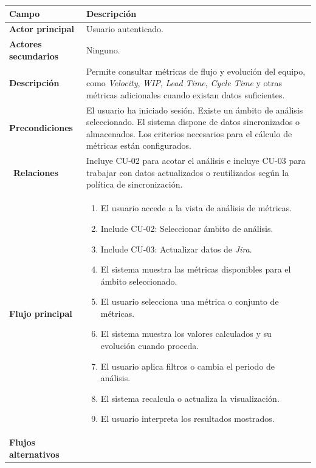 {\renewcommand{\arraystretch}{1.25}\footnotesize
\begin{longtable}{p{3.2cm}p{10.2cm}}
\toprule
\textbf{Campo} & \textbf{Descripción} \\
\midrule
\textbf{Actor principal} & Usuario autenticado. \\
\textbf{Actores secundarios} & Ninguno. \\
\textbf{Descripción} & Permite consultar métricas de flujo y evolución del equipo, como \textit{Velocity}, \textit{WIP}, \textit{Lead Time}, \textit{Cycle Time} y otras métricas adicionales cuando existan datos suficientes. \\
\textbf{Precondiciones} & El usuario ha iniciado sesión. Existe un ámbito de análisis seleccionado. El sistema dispone de datos sincronizados o almacenados. Los criterios necesarios para el cálculo de métricas están configurados. \\\
\textbf{Relaciones} & Incluye CU-02 para acotar el análisis e incluye CU-03 para trabajar con datos actualizados o reutilizados según la política de sincronización. \\
\textbf{Flujo principal} & \begin{minipage}[t]{10.2cm}\begin{enumerate}[noitemsep,leftmargin=*]
    \item El usuario accede a la vista de análisis de métricas.
    \item Include CU-02: Seleccionar ámbito de análisis.
    \item Include CU-03: Actualizar datos de \textit{Jira}.
    \item El sistema muestra las métricas disponibles para el ámbito seleccionado.
    \item El usuario selecciona una métrica o conjunto de métricas.
    \item El sistema muestra los valores calculados y su evolución cuando proceda.
    \item El usuario aplica filtros o cambia el periodo de análisis.
    \item El sistema recalcula o actualiza la visualización.
    \item El usuario interpreta los resultados mostrados.
\end{enumerate}\end{minipage} \\
\textbf{Flujos alternativos} & \begin{minipage}[t]{10.2cm}\begin{itemize}[noitemsep,leftmargin=*]

\end{itemize}
\end{minipage}
\end{longtable}}
